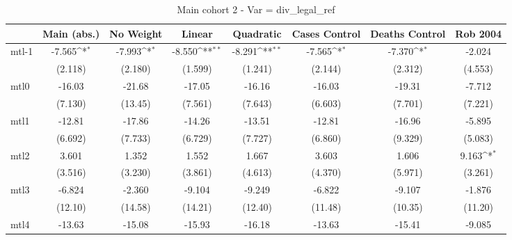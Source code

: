 \documentclass{article}
\begin{document}
{
\def\sym#1{\ifmmode^{#1}\else\(^{#1}\)\fi}
\begin{longtable}{l*{7}{c}}
\caption{Main cohort 2 - Var = div\_legal\_ref}\\
\hline\hline\endfirsthead\hline\endhead\hline\endfoot\endlastfoot
                &\multicolumn{1}{c}{Main (abs.)}&\multicolumn{1}{c}{No Weight}&\multicolumn{1}{c}{Linear}&\multicolumn{1}{c}{Quadratic}&\multicolumn{1}{c}{Cases Control}&\multicolumn{1}{c}{Deaths Control}&\multicolumn{1}{c}{Rob 2004}\\
\hline
mtl-1           &   -7.565\sym{*}  &   -7.993\sym{*}  &   -8.550\sym{**} &   -8.291\sym{**} &   -7.565\sym{*}  &   -7.370\sym{*}  &   -2.024         \\
                &  (2.118)         &  (2.180)         &  (1.599)         &  (1.241)         &  (2.144)         &  (2.312)         &  (4.553)         \\
mtl0            &   -16.03         &   -21.68         &   -17.05         &   -16.16         &   -16.03         &   -19.31         &   -7.712         \\
                &  (7.130)         &  (13.45)         &  (7.561)         &  (7.643)         &  (6.603)         &  (7.701)         &  (7.221)         \\
mtl1            &   -12.81         &   -17.86         &   -14.26         &   -13.51         &   -12.81         &   -16.96         &   -5.895         \\
                &  (6.692)         &  (7.733)         &  (6.729)         &  (7.727)         &  (6.860)         &  (9.329)         &  (5.083)         \\
mtl2            &    3.601         &    1.352         &    1.552         &    1.667         &    3.603         &    1.606         &    9.163\sym{*}  \\
                &  (3.516)         &  (3.230)         &  (3.861)         &  (4.613)         &  (4.370)         &  (5.971)         &  (3.261)         \\
mtl3            &   -6.824         &   -2.360         &   -9.104         &   -9.249         &   -6.822         &   -9.107         &   -1.876         \\
                &  (12.10)         &  (14.58)         &  (14.21)         &  (12.40)         &  (11.48)         &  (10.35)         &  (11.20)         \\
mtl4            &   -13.63         &   -15.08         &   -15.93         &   -16.18         &   -13.63         &   -15.41         &   -9.085         \\

\end{longtable}}
\end{document}
